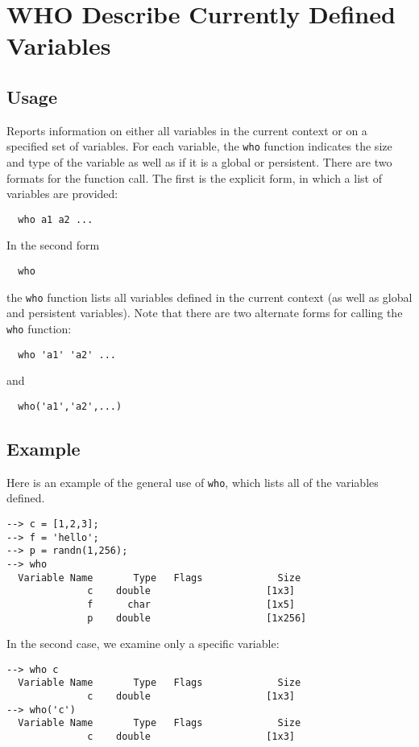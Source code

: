 \section{WHO Describe Currently Defined Variables}

\subsection{Usage}

Reports information on either all variables in the current context
or on a specified set of variables.  For each variable, the \verb|who|
function indicates the size and type of the variable as well as 
if it is a global or persistent.  There are two formats for the 
function call.  The first is the explicit form, in which a list
of variables are provided:
\begin{verbatim}
  who a1 a2 ...
\end{verbatim}
In the second form
\begin{verbatim}
  who
\end{verbatim}
the \verb|who| function lists all variables defined in the current 
context (as well as global and persistent variables). Note that
there are two alternate forms for calling the \verb|who| function:
\begin{verbatim}
  who 'a1' 'a2' ...
\end{verbatim}
and
\begin{verbatim}
  who('a1','a2',...)
\end{verbatim}
\subsection{Example}

Here is an example of the general use of \verb|who|, which lists all of the variables defined.
\begin{verbatim}
--> c = [1,2,3];
--> f = 'hello';
--> p = randn(1,256);
--> who
  Variable Name       Type   Flags             Size
              c    double                    [1x3]
              f      char                    [1x5]
              p    double                    [1x256]
\end{verbatim}
In the second case, we examine only a specific variable:
\begin{verbatim}
--> who c
  Variable Name       Type   Flags             Size
              c    double                    [1x3]
--> who('c')
  Variable Name       Type   Flags             Size
              c    double                    [1x3]
\end{verbatim}
